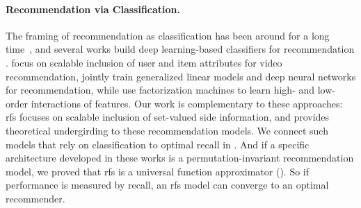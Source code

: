 \paragraph{Recommendation via Classification.} The framing of recommendation as classification has been around for a long time~\citep{basu1998recommendation}, and several works build deep learning-based classifiers for recommendation \citep{covington2016deep,cheng2016wide,guo2017deepfm:,he2017neural}. \citet{covington2016deep} focus on scalable inclusion of user and item attributes for video recommendation, \citet{cheng2016wide} jointly train generalized linear models and deep neural networks for recommendation, while \citet{guo2017deepfm:} use factorization machines to learn high- and low-order interactions of features. Our work is complementary to these approaches: \gls{rfs} focuses on scalable inclusion of set-valued side information, and provides theoretical undergirding to these recommendation models. We connect such models that rely on classification to optimal recall in . And if a specific architecture developed in these works is a permutation-invariant recommendation model, we proved that \gls{rfs} is a universal function approximator (). So if performance is measured by recall, an \gls{rfs} model can converge to an optimal recommender.

